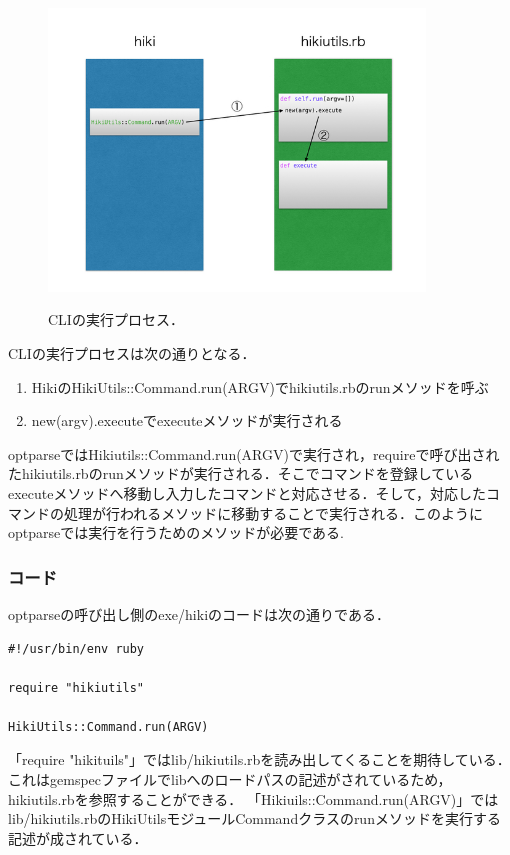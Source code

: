 \begin{figure}[htbp]\begin{center}
\includegraphics[width=10cm,bb= 0 0 737 553]{../figs/./hikiutils_yamane.007.jpg}
\caption{CLIの実行プロセス．}
\label{fig:007}
\label{default}\end{center}\end{figure}
CLIの実行プロセスは次の通りとなる．

\begin{enumerate}
\item HikiのHikiUtils::Command.run(ARGV)でhikiutils.rbのrunメソッドを呼ぶ
\item new(argv).executeでexecuteメソッドが実行される
\end{enumerate}
optparseではHikiutils::Command.run(ARGV)で実行され，requireで呼び出されたhikiutils.rbのrunメソッドが実行される．そこでコマンドを登録しているexecuteメソッドへ移動し入力したコマンドと対応させる．そして，対応したコマンドの処理が行われるメソッドに移動することで実行される．このようにoptparseでは実行を行うためのメソッドが必要である.

\subsubsection{コード}
optparseの呼び出し側のexe/hikiのコードは次の通りである．
\begin{lstlisting}[style=customRuby,basicstyle={\scriptsize\ttfamily}]
#!/usr/bin/env ruby                                                             

require "hikiutils"

HikiUtils::Command.run(ARGV)
\end{lstlisting}
「require "hikituils"」ではlib/hikiutils.rbを読み出してくることを期待している．
これはgemspecファイルでlibへのロードパスの記述がされているため，hikiutils.rbを参照することができる．
「Hikiuils::Command.run(ARGV)」ではlib/hikiutils.rbのHikiUtilsモジュールCommandクラスのrunメソッドを実行する記述が成されている．

